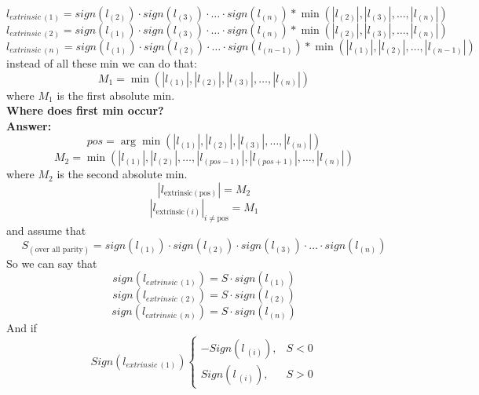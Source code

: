 \[ l_{extrinsic\ \left(1\right)}=sign\left(l_{\left(2\right)}\right)\cdot sign\left(l_{\left(3\right)}\right) \cdot \ldots \cdot sign\left(l_{\left(n\right)}\right)\ast \min\left(\left|l_{\left(2\right)}\right|,\left|l_{\left(3\right)}\right|,\ldots,\left|l_{\left(n\right)}\right|\right) \]
\[ l_{extrinsic\ \left(2\right)}=sign\left(l_{\left(1\right)}\right)\cdot sign\left(l_{\left(3\right)}\right) \cdot \ldots \cdot sign\left(l_{\left(n\right)}\right)\ast \min\left(\left|l_{\left(2\right)}\right|,\left|l_{\left(3\right)}\right|,\ldots,\left|l_{\left(n\right)}\right|\right) \]
\[ l_{extrinsic\ \left(n\right)}=sign\left(l_{\left(1\right)}\right)\cdot sign\left(l_{\left(2\right)}\right) \cdot \ldots \cdot sign\left(l_{\left(n-1\right)}\right)\ast \min\left(\left|l_{\left(1\right)}\right|,\left|l_{\left(2\right)}\right|,\ldots,\left|l_{\left(n-1\right)}\right|\right) \]
instead of all these min we can do that:
\[ M_1=\min\left(\left|l_{\left(1\right)}\right|,\left|l_{\left(2\right)}\right|,\left|l_{\left(3\right)}\right|,\ldots,\left|l_{\left(n\right)}\right|\right) \]
where $M_1$ is the first absolute min.\\
\textbf{Where does first min occur?}\\
\textbf{Answer:}
\[ pos=\arg{\min\left(\left|l_{\left(1\right)}\right|,\left|l_{\left(2\right)}\right|,\left|l_{\left(3\right)}\right|,\ldots,\left|l_{\left(n\right)}\right|\right)} \]
\[ M_2=\min\left(\left|l_{\left(1\right)}\right|,\left|l_{\left(2\right)}\right|,\ldots,\left|l_{\left(pos-1\right)}\right|,\left|l_{\left(pos+1\right)}\right|,\ldots,\left|l_{\left(n\right)}\right|\right) \]
where $M_2$ is the second absolute min.
\[\left|l_{\text{extrinsic}\left(\text{pos}\right)}\right|=M_2\]
\[\left|l_{\text{extrinsic}\left(i\right)}\right|_{i\neq \text{pos}}=M_1\]
and assume that 
\[ S_{(\text{over all parity})}=sign\left(l_{\left(1\right)}\right) \cdot sign\left(l_{\left(2\right)}\right) \cdot sign\left(l_{\left(3\right)}\right)\cdot\ldots\cdot sign\left(l_{\left(n\right)}\right) \]
So we can say that
\[ sign\left(l_{extrinsic\ \left(1\right)}\right)=S \cdot sign\left(l_{\left(1\right)}\right) \]
\[ sign\left(l_{extrinsic\ \left(2\right)}\right)=S \cdot sign\left(l_{\left(2\right)}\right) \]
\[ sign\left(l_{extrinsic\ \left(n\right)}\right)=S \cdot sign\left(l_{\left(n\right)}\right) \]
And if
\begin{equation*}
    Sign\left(l_{extrinsic\ \left(1\right)}\right)
    \begin{cases}
        -Sign\left(l_{\ \left(i\right)}\right), & S < 0 \\
        Sign\left(l_{\ \left(i\right)}\right), & S > 0
    \end{cases}
\end{equation*}
